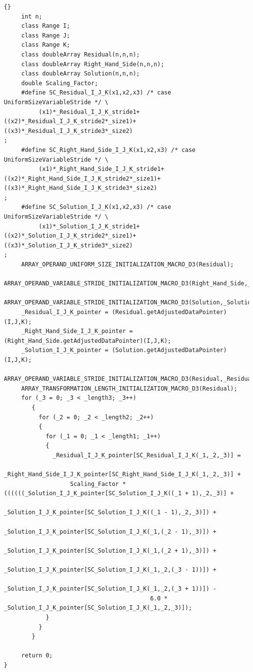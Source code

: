\documentclass[10pt]{article}
\begin{document}
\begin{lstlisting}{}
     int n;
     class Range I;
     class Range J;
     class Range K;
     class doubleArray Residual(n,n,n);
     class doubleArray Right_Hand_Side(n,n,n);
     class doubleArray Solution(n,n,n);
     double Scaling_Factor; 
     #define SC_Residual_I_J_K(x1,x2,x3) /* case UniformSizeVariableStride */ \
          (x1)*_Residual_I_J_K_stride1+((x2)*_Residual_I_J_K_stride2*_size1)+((x3)*_Residual_I_J_K_stride3*_size2)
;
     #define SC_Right_Hand_Side_I_J_K(x1,x2,x3) /* case UniformSizeVariableStride */ \
          (x1)*_Right_Hand_Side_I_J_K_stride1+((x2)*_Right_Hand_Side_I_J_K_stride2*_size1)+((x3)*_Right_Hand_Side_I_J_K_stride3*_size2)
;
     #define SC_Solution_I_J_K(x1,x2,x3) /* case UniformSizeVariableStride */ \
          (x1)*_Solution_I_J_K_stride1+((x2)*_Solution_I_J_K_stride2*_size1)+((x3)*_Solution_I_J_K_stride3*_size2)
; 
     ARRAY_OPERAND_UNIFORM_SIZE_INITIALIZATION_MACRO_D3(Residual); 
     ARRAY_OPERAND_VARIABLE_STRIDE_INITIALIZATION_MACRO_D3(Right_Hand_Side,_Right_Hand_Side_I_J_K); 
     ARRAY_OPERAND_VARIABLE_STRIDE_INITIALIZATION_MACRO_D3(Solution,_Solution_I_J_K); 
     _Residual_I_J_K_pointer = (Residual.getAdjustedDataPointer)(I,J,K); 
     _Right_Hand_Side_I_J_K_pointer = (Right_Hand_Side.getAdjustedDataPointer)(I,J,K); 
     _Solution_I_J_K_pointer = (Solution.getAdjustedDataPointer)(I,J,K); 
     ARRAY_OPERAND_VARIABLE_STRIDE_INITIALIZATION_MACRO_D3(Residual,_Residual_I_J_K); 
     ARRAY_TRANSFORMATION_LENGTH_INITIALIZATION_MACRO_D3(Residual); 
     for (_3 = 0; _3 < _length3; _3++)
        { 
          for (_2 = 0; _2 < _length2; _2++)
          { 
            for (_1 = 0; _1 < _length1; _1++)
            { 
              _Residual_I_J_K_pointer[SC_Residual_I_J_K(_1,_2,_3)] =
                   _Right_Hand_Side_I_J_K_pointer[SC_Right_Hand_Side_I_J_K(_1,_2,_3)] + 
                   Scaling_Factor * ((((((_Solution_I_J_K_pointer[SC_Solution_I_J_K((_1 + 1),_2,_3)] + 
                                          _Solution_I_J_K_pointer[SC_Solution_I_J_K((_1 - 1),_2,_3)]) +
                                          _Solution_I_J_K_pointer[SC_Solution_I_J_K(_1,(_2 - 1),_3)]) +
                                          _Solution_I_J_K_pointer[SC_Solution_I_J_K(_1,(_2 + 1),_3)]) + 
                                          _Solution_I_J_K_pointer[SC_Solution_I_J_K(_1,_2,(_3 - 1))]) +
                                          _Solution_I_J_K_pointer[SC_Solution_I_J_K(_1,_2,(_3 + 1))]) -
                                          6.0 * _Solution_I_J_K_pointer[SC_Solution_I_J_K(_1,_2,_3)]);
            } 
          } 
        } 

     return 0;
} 

\end{lstlisting}
\end{document}
